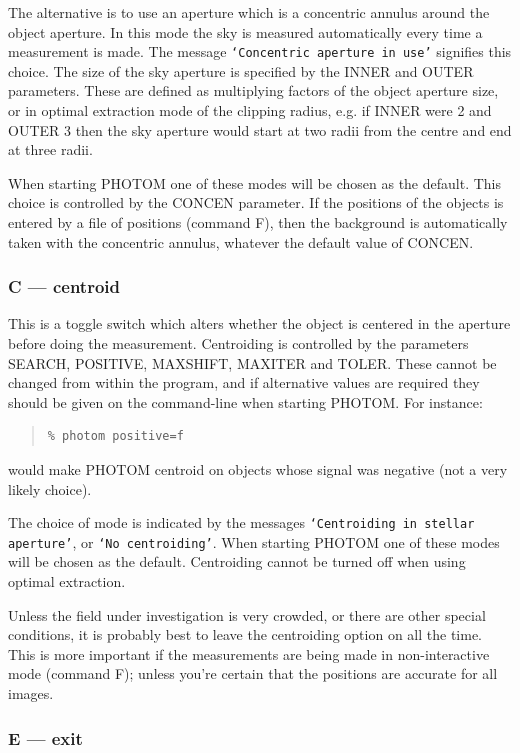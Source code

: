 \documentclass[twoside,11pt]{article}
\renewcommand{\_}{\texttt{\symbol{95}}}
\newcommand{\st}[1]{\texttt{`#1'}}
\begin{document}
The alternative is to use an aperture which is a concentric annulus
around the object aperture. In this mode the sky is measured
automatically every time a measurement is made. The message
\st{Concentric aperture in use} signifies this choice. The size of the
sky aperture is specified by the INNER and OUTER parameters. These are
defined as multiplying factors of the object aperture size, or in optimal
extraction mode of the clipping radius, e.g. if INNER were 2 and OUTER 3
then the sky aperture would start at two radii from the centre and end at
three radii.

When starting PHOTOM one of these modes will be chosen as the default.
This choice is controlled by the CONCEN parameter.
If the positions of the objects is entered by a file of positions
(command F), then the background is automatically taken with the
concentric annulus, whatever the default value of CONCEN.

\subsubsection{C --- centroid}

This is a toggle switch which alters whether the object is centered in
the aperture before doing the measurement. Centroiding is
controlled by the parameters SEARCH, POSITIVE, MAXSHIFT, MAXITER and
TOLER. These cannot be changed from within the program, and if
alternative values are required they should be given on the
command-line when starting PHOTOM. For instance:
\begin{quote}
\begin{verbatim}
% photom positive=f
\end{verbatim}
\end{quote}
would make PHOTOM centroid on objects whose signal was negative (not a
very likely choice).

The choice of mode is indicated by the messages \st{Centroiding in stellar
aperture}, or \st{No centroiding}. When starting PHOTOM one of these modes
will be chosen as the default. Centroiding cannot be turned off when using optimal extraction.

Unless the field under investigation is very crowded, or there are other
special conditions, it is probably best to leave the centroiding option
on all the time. This is more important if the measurements are being
made in non-interactive mode (command F); unless you're certain
that the positions are accurate for all images.

\subsubsection{E --- exit}
\end{document}
